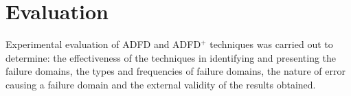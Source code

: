 \documentclass[runningheads,a4paper]{llncs}
\begin{document}
\begin{enumerate}
%

%
%


\end{enumerate}





\section{Evaluation}
Experimental evaluation of ADFD and ADFD$^+$ techniques was carried out to determine: the effectiveness of the techniques in identifying and presenting the failure domains, the types and frequencies of failure domains, the nature of error causing a failure domain and the external validity of the results obtained. 

\end{document}
